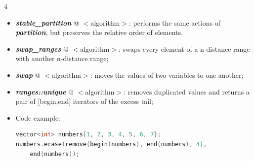 \documentclass[10pt]{article}
\begin{document}
\begin{multicols*}{4}
{\begin{itemize}[leftmargin=*,topsep=0.25pt]
	\item  \emph{\textbf{stable\_partition}} @ $<$algorithm$>$: performs the same actions of  \emph{\textbf{partition}}, but preserves the relative order of elements. 
	\item  \emph{\textbf{swap\_ranges}} @ $<$algorithm$>$: swaps every element of a n-distance range with another n-distance range;
	\item  \emph{\textbf{swap}} @ $<$algorithm$>$: moves the values of two variables to one another;
	\item  \emph{\textbf{ranges::unique}} @ $<$algorithm$>$: removes duplicated values and returns a pair of [begin,end] iterators of the excess tail;
	
\item Code example:
{\selectfont \lstset{style=mystyle}
 \begin{lstlisting}[language=C++]
vector<int> numbers{1, 2, 3, 4, 5, 6, 7};
numbers.erase(remove(begin(numbers), end(numbers), 4), 
	end(numbers));
\end{lstlisting}
 }

\end{itemize}

}
\end{multicols*}
\end{document}
